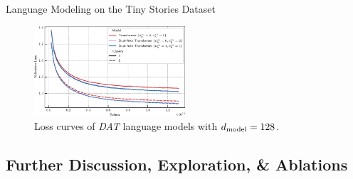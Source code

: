 \begin{table}
    \caption{Language Modeling on the Tiny Stories Dataset}\label{tab:tiny_stories_results}
    
\end{table}

\begin{figure}
    \centering
    \includegraphics[width=0.5\textwidth]{figs/experiments/tiny_stories/d128L4L6_symattn_asymra.pdf}
    \caption{Loss curves of \textit{DAT} language models with $d_{\mathrm{model}} = 128$.}\label{fig:tiny_stories_val_loss_curves_d128}
\end{figure}

\subsection*{Further Discussion, Exploration, \& Ablations}

